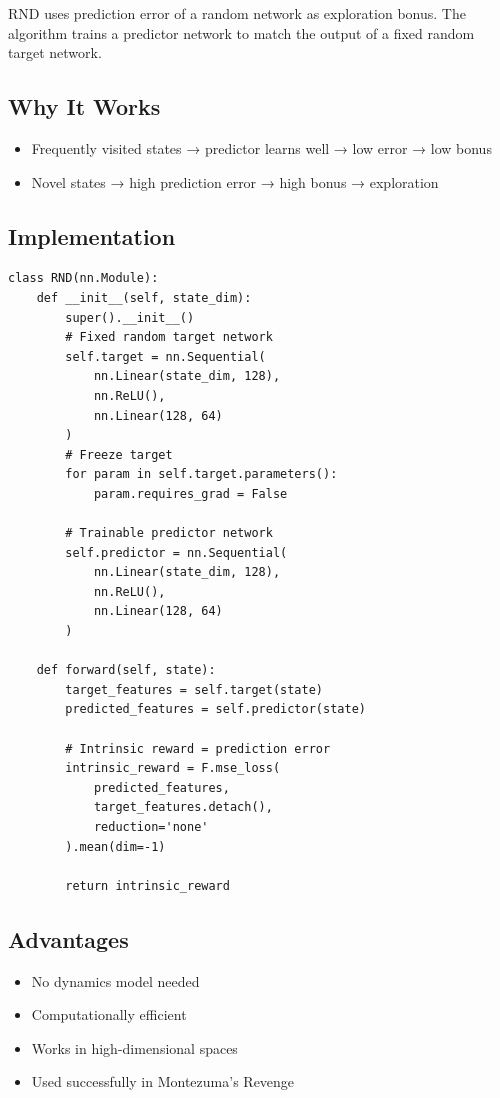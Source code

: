 \documentclass[12pt]{article}
\begin{document}
{{{RND uses prediction error of a random network as exploration bonus. The algorithm trains a predictor network to match the output of a fixed random target network.

\subsection{Why It Works}

\begin{itemize}
\item Frequently visited states → predictor learns well → low error → low bonus
\item Novel states → high prediction error → high bonus → exploration
\end{itemize}

\subsection{Implementation}

\begin{verbatim}
class RND(nn.Module):
    def __init__(self, state_dim):
        super().__init__()
        # Fixed random target network
        self.target = nn.Sequential(
            nn.Linear(state_dim, 128),
            nn.ReLU(),
            nn.Linear(128, 64)
        )
        # Freeze target
        for param in self.target.parameters():
            param.requires_grad = False
        
        # Trainable predictor network
        self.predictor = nn.Sequential(
            nn.Linear(state_dim, 128),
            nn.ReLU(),
            nn.Linear(128, 64)
        )
    
    def forward(self, state):
        target_features = self.target(state)
        predicted_features = self.predictor(state)
        
        # Intrinsic reward = prediction error
        intrinsic_reward = F.mse_loss(
            predicted_features, 
            target_features.detach(),
            reduction='none'
        ).mean(dim=-1)
        
        return intrinsic_reward
\end{verbatim}

\subsection{Advantages}

\begin{itemize}
\item No dynamics model needed
\item Computationally efficient
\item Works in high-dimensional spaces
\item Used successfully in Montezuma's Revenge
\end{itemize}

}}}
\end{document}
